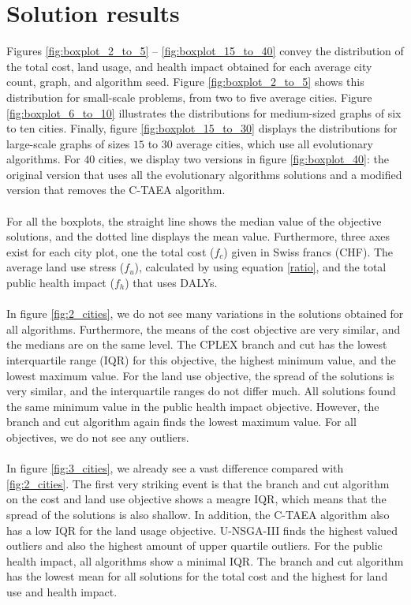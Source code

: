 \documentclass[mscthesis, 11pt]{usiinfthesis}
\theoremstyle{newdefinition}
\begin{document}
\section{Solution results}\label{sec:sol_res}
Figures \ref{fig:boxplot_2_to_5} -- \ref{fig:boxplot_15_to_40} convey the distribution of the total cost, land usage, and health impact obtained for each average city count, graph, and algorithm seed. Figure \ref{fig:boxplot_2_to_5} shows this distribution for small-scale problems, from two to five average cities. Figure \ref{fig:boxplot_6_to_10} illustrates the distributions for medium-sized graphs of six to ten cities. Finally, figure \ref{fig:boxplot_15_to_30} displays the distributions for large-scale graphs of sizes $15$ to $30$ average cities, which use all evolutionary algorithms. For $40$ cities, we display two versions in figure \ref{fig:boxplot_40}: the original version that uses all the evolutionary algorithms solutions and a modified version that removes the C-TAEA algorithm.
\\\\
For all the boxplots, the straight line shows the median value of the objective solutions, and the dotted line displays the mean value. Furthermore, three axes exist for each city plot, one the total cost ($f_c$) given in Swiss francs (CHF). The average land use stress ($f_u$), calculated by using equation \ref{ratio}, and the total public health impact ($f_h$) that uses DALYs.
\\\\
In figure \ref{fig:2_cities}, we do not see many variations in the solutions obtained for all algorithms. Furthermore, the means of the cost objective are very similar, and the medians are on the same level. The CPLEX branch and cut has the lowest interquartile range (IQR) for this objective, the highest minimum value, and the lowest maximum value. For the land use objective, the spread of the solutions is very similar, and the interquartile ranges do not differ much. All solutions found the same minimum value in the public health impact objective. However, the branch and cut algorithm again finds the lowest maximum value. For all objectives, we do not see any outliers.
\\\\
In figure \ref{fig:3_cities}, we already see a vast difference compared with \ref{fig:2_cities}. The first very striking event is that the branch and cut algorithm on the cost and land use objective shows a meagre IQR, which means that the spread of the solutions is also shallow. In addition, the C-TAEA algorithm also has a low IQR for the land usage objective. U-NSGA-III finds the highest valued outliers and also the highest amount of upper quartile outliers. For the public health impact, all algorithms show a minimal IQR. The branch and cut algorithm has the lowest mean for all solutions for the total cost and the highest for land use and health impact.
\end{document}
